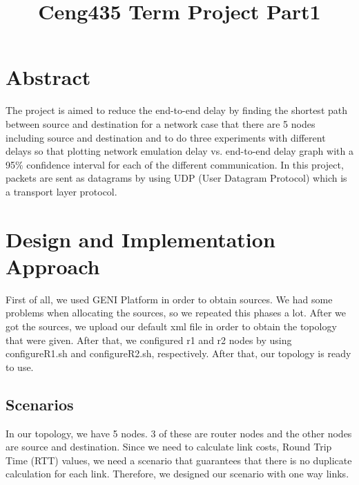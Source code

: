\documentclass[conference]{IEEEtran}
\begin{document}
\title{Ceng435 Term Project Part1\\
}

\author{
\and
{}
}

\maketitle

\section{Abstract}
The project is aimed to reduce the end-to-end delay by finding the shortest path between source and destination for a network case that there are 5 nodes including source and destination and to do three experiments with different delays so that plotting network emulation delay vs. end-to-end delay graph with a 95$\%$ confidence interval for each of the different communication. In this project, packets are sent as datagrams by using UDP (User Datagram Protocol) which is a transport layer protocol.
\section{Design and Implementation Approach}
First of all, we used GENI Platform in order to obtain sources. We had some problems when allocating the sources, so we repeated this phases a lot. After we got the sources, we upload our default xml file in order to obtain the topology that were given. After that, we configured r1 and r2 nodes by using configureR1.sh and configureR2.sh, respectively. After that, our topology is ready to use.
\subsection{Scenarios}
In our topology, we have 5 nodes. 3 of these are router nodes and the other nodes are source and destination. Since we need to calculate link costs, Round Trip Time (RTT) values, we need a scenario that guarantees that there is no duplicate calculation for each link. Therefore, we designed our scenario with one way links. \\
\end{document}
